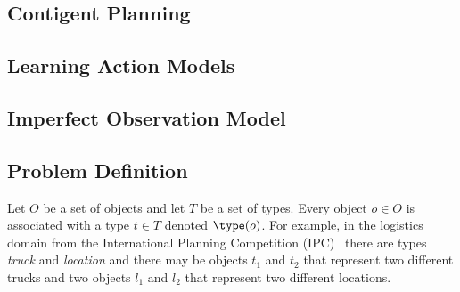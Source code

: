 









\subsection{Contigent Planning}
\subsection{Learning Action Models}
\subsection{Imperfect Observation Model}
\subsection{Problem Definition}
Let $O$ be a set of objects and let $T$ be a set of types. 
Every object $o\in O$ is associated with a type $t\in T$ denoted $\type(o)$. 
For example, in the logistics domain from the International Planning Competition (IPC)~\cite{ipc} there are types \emph{truck} and \emph{location} and there may be objects $t_1$ and $t_2$ that represent two different trucks and two objects $l_1$ and $l_2$ that represent two different locations. 

